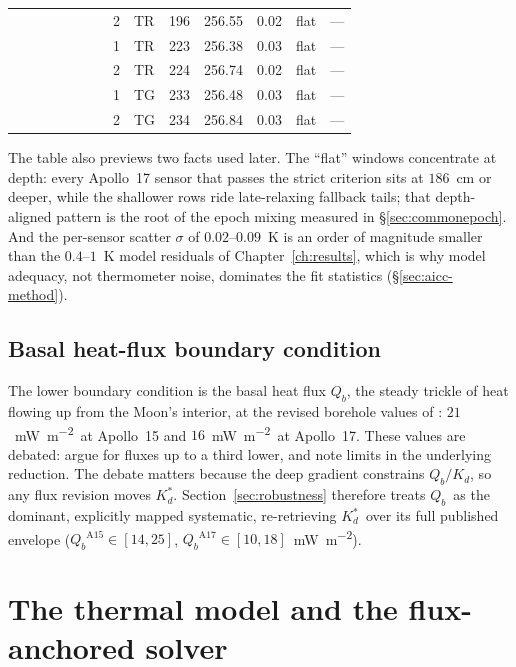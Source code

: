 \documentclass[11pt,a4paper,oneside]{report}
\newcommand{\Kd}{\ensuremath{K_d}}
\newcommand{\Kds}{\ensuremath{K_d^{*}}}
\newcommand{\Qb}{\ensuremath{Q_b}}
\newcommand{\mWm}{\si{\milli\watt\per\square\meter}}
\begin{document}
\begin{table}[htbp]
\begin{tabular}{llrrrlr@{\qquad}llrrrlr}
      &    &     &        &      &      &         & 2 & TR & 196 & 256.55 & 0.02 & flat & ---     \\
      &    &     &        &      &      &         & 1 & TR & 223 & 256.38 & 0.03 & flat & ---     \\
      &    &     &        &      &      &         & 2 & TR & 224 & 256.74 & 0.02 & flat & ---     \\
      &    &     &        &      &      &         & 1 & TG & 233 & 256.48 & 0.03 & flat & ---     \\
      &    &     &        &      &      &         & 2 & TG & 234 & 256.84 & 0.03 & flat & ---     \\
    \bottomrule
  \end{tabular}
\end{table}

The table also previews two facts used later. The ``flat'' windows
concentrate at depth: every Apollo~17 sensor that passes the strict
criterion sits at $186$~cm or deeper, while the shallower rows ride
late-relaxing fallback tails; that depth-aligned pattern is the root
of the epoch mixing measured in \S\ref{sec:commonepoch}. And the
per-sensor scatter $\sigma$ of $0.02$--$0.09$~K is an order of
magnitude smaller than the $0.4$--$1$~K model residuals of
Chapter~\ref{ch:results}, which is why model adequacy, not thermometer
noise, dominates the fit statistics (\S\ref{sec:aicc-method}).

\section{Basal heat-flux boundary condition}\label{sec:qb-data}
The lower boundary condition is the basal heat flux \Qb, the steady
trickle of heat flowing up from the Moon's interior, at the revised
borehole values of \citet{langseth1976}: $21$~\mWm\ at Apollo~15 and
$16$~\mWm\ at Apollo~17. These values are debated: \citet{saito2007}
argue for fluxes up to a third lower, and \citet{nagihara2018} note
limits in the underlying reduction. The debate matters because the
deep gradient constrains $\Qb/\Kd$, so any flux revision moves \Kds.
Section~\ref{sec:robustness} therefore treats \Qb\ as the dominant,
explicitly mapped systematic, re-retrieving \Kds\ over its full
published envelope
($\Qb^{\mathrm{A15}}\in[14,25]$, $\Qb^{\mathrm{A17}}\in[10,18]$~\mWm).

\chapter{The thermal model and the flux-anchored
  solver}\label{ch:model}\label{ch:method}
\end{document}
